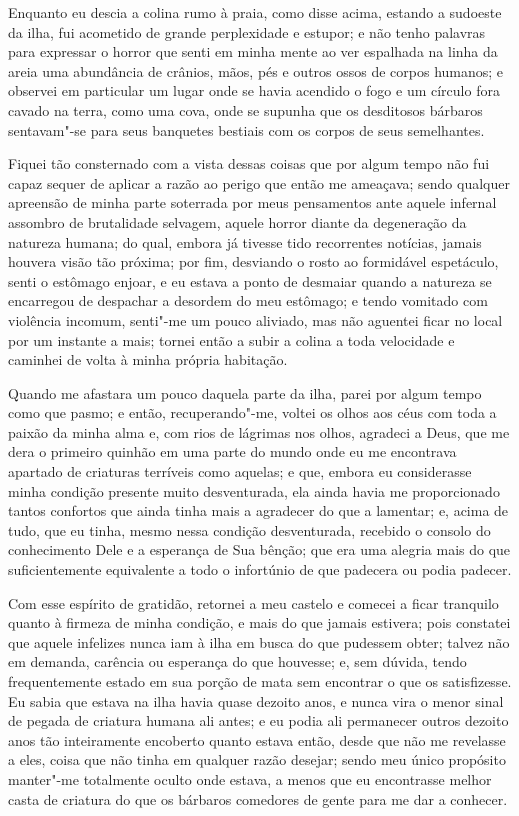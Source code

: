 Enquanto eu descia a colina rumo à praia, como disse acima, estando a
sudoeste da ilha, fui acometido de grande perplexidade e estupor; e não
tenho palavras para expressar o horror que senti em minha mente ao ver
espalhada na linha da areia uma abundância de crânios, mãos, pés e
outros ossos de corpos humanos; e observei em particular um lugar onde
se havia acendido o fogo e um círculo fora cavado na terra, como uma
cova, onde se supunha que os desditosos bárbaros sentavam"-se para seus
banquetes bestiais com os corpos de seus semelhantes.

Fiquei tão consternado com a vista dessas coisas que por algum tempo não
fui capaz sequer de aplicar a razão ao perigo que então me ameaçava;
sendo qualquer apreensão de minha parte soterrada por meus pensamentos
ante aquele infernal assombro de brutalidade selvagem, aquele horror
diante da degeneração da natureza humana; do qual, embora já tivesse
tido recorrentes notícias, jamais houvera visão tão próxima; por fim,
desviando o rosto ao formidável espetáculo, senti o estômago enjoar, e
eu estava a ponto de desmaiar quando a natureza se encarregou de
despachar a desordem do meu estômago; e tendo vomitado com violência
incomum, senti"-me um pouco aliviado, mas não aguentei ficar no local por
um instante a mais; tornei então a subir a colina a toda velocidade e
caminhei de volta à minha própria habitação.

Quando me afastara um pouco daquela parte da ilha, parei por algum tempo
como que pasmo; e então, recuperando"-me, voltei os olhos aos céus com
toda a paixão da minha alma e, com rios de lágrimas nos olhos, agradeci
a Deus, que me dera o primeiro quinhão em uma parte do mundo onde eu me
encontrava apartado de criaturas terríveis como aquelas; e que, embora
eu considerasse minha condição presente muito desventurada, ela ainda
havia me proporcionado tantos confortos que ainda tinha mais a agradecer
do que a lamentar; e, acima de tudo, que eu tinha, mesmo nessa condição
desventurada, recebido o consolo do conhecimento Dele e a esperança de
Sua bênção; que era uma alegria mais do que suficientemente equivalente
a todo o infortúnio de que padecera ou podia padecer.

Com esse espírito de gratidão, retornei a meu castelo e comecei a ficar
tranquilo quanto à firmeza de minha condição, e mais do que jamais
estivera; pois constatei que aquele infelizes nunca iam à ilha em busca
do que pudessem obter; talvez não em demanda, carência ou esperança do
que houvesse; e, sem dúvida, tendo frequentemente estado em sua porção
de mata sem encontrar o que os satisfizesse. Eu sabia que estava na ilha
havia quase dezoito anos, e nunca vira o menor sinal de pegada de
criatura humana ali antes; e eu podia ali permanecer outros dezoito anos
tão inteiramente encoberto quanto estava então, desde que não me
revelasse a eles, coisa que não tinha em qualquer razão desejar; sendo
meu único propósito manter"-me totalmente oculto onde estava, a menos que
eu encontrasse melhor casta de criatura do que os bárbaros comedores de
gente para me dar a conhecer.

